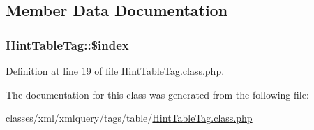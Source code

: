 \subsection{Member Data Documentation}
\subsubsection[{\texorpdfstring{\$index}{$index}}]{\setlength{\rightskip}{0pt plus 5cm}Hint\+Table\+Tag\+::\$index}\hypertarget{classHintTableTag_aaed2fb461aff0380f77a16df5d04298c}{}\label{classHintTableTag_aaed2fb461aff0380f77a16df5d04298c}


Definition at line 19 of file Hint\+Table\+Tag.\+class.\+php.



The documentation for this class was generated from the following file\+:\begin{DoxyCompactItemize}
\item 
classes/xml/xmlquery/tags/table/\hyperlink{HintTableTag_8class_8php}{Hint\+Table\+Tag.\+class.\+php}\end{DoxyCompactItemize}
